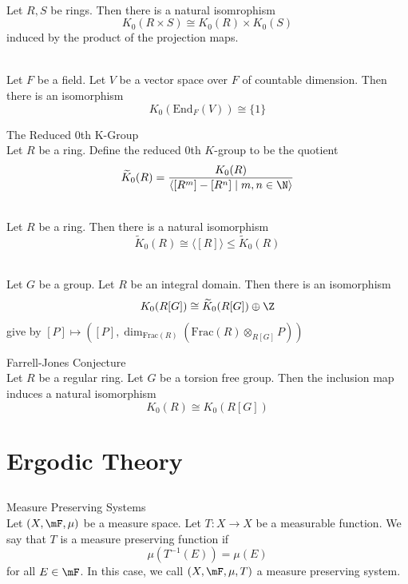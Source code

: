 \documentclass[a4paper]{article}
\begin{document}
\begin{prp}{}{}\\
Let $R,S$ be rings. Then there is a natural isomrophism $$K_0(R\times S)\cong K_0(R)\times K_0(S)$$ induced by the product of the projection maps. 
\end{prp}

\begin{eg}{}{}\\
Let $F$ be a field. Let $V$ be a vector space over $F$ of countable dimension. Then there is an isomorphism $$K_0(\text{End}_F(V))\cong\{1\}$$
\end{eg}

\begin{defn}{The Reduced 0th K-Group}{}\\
Let $R$ be a ring. Define the reduced $0$th $K$-group to be the quotient $$\widetilde{K}_0(R)=\frac{K_0(R)}{\langle[R^m]-[R^n]\;|\;m,n\in\N\rangle}$$
\end{defn}

\begin{lmm}{}{}\\
Let $R$ be a ring. Then there is a natural isomorphism $$\widetilde{K}_0(R)\cong\langle[R]\rangle\leq\widetilde{K}_0(R)$$
\end{lmm}

\begin{prp}{}{}\\
Let $G$ be a group. Let $R$ be an integral domain. Then there is an isomorphism $$K_0(R[G])\cong\widetilde{K}_0(R[G])\oplus\Z$$ give by $[P]\mapsto([P],\dim_{\text{Frac}(R)}(\text{Frac}(R)\otimes_{R[G]}P))$
\end{prp}

\begin{conj}{Farrell-Jones Conjecture}{}\\
Let $R$ be a regular ring. Let $G$ be a torsion free group. Then the inclusion map induces a natural isomorphism $$K_0(R)\cong K_0(R[G])$$
\end{conj}

\pagebreak
\section{Ergodic Theory}
\subsection{}
\begin{defn}{Measure Preserving Systems}{}\\
Let $(X,\mF,\mu)$ be a measure space. Let $T:X\to X$ be a measurable function. We say that $T$ is a measure preserving function if $$\mu(T^{-1}(E))=\mu(E)$$ for all $E\in\mF$. In this case, we call $(X,\mF,\mu,T)$ a measure preserving system. 
\end{defn}
\end{document}
